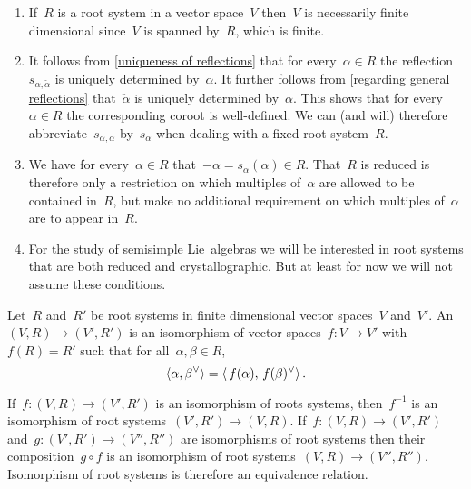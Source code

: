 \begin{remark}
  \leavevmode
  \begin{enumerate}
    \item
      If~$R$ is a root system in a vector space~$V$ then~$V$ is necessarily finite dimensional since~$V$ is spanned by~$R$, which is finite.
    \item
      It follows from \cref{uniqueness of reflections} that for every~$\alpha \in R$ the reflection~$s_{\alpha, \check{\alpha}}$ is uniquely determined by~$\alpha$.
      It further follows from \cref{regarding general reflections} that~$\check{\alpha}$ is uniquely determined by~$\alpha$.
      This shows that for every~$\alpha \in R$ the corresponding coroot is well-defined.
      We can (and will) therefore abbreviate~$s_{\alpha, \check{\alpha}}$ by~$s_\alpha$ when dealing with a fixed root system~$R$.
    \item
      We have for every~$\alpha \in R$ that~$-\alpha = s_\alpha(\alpha) \in R$.
      That~$R$ is reduced is therefore only a restriction on which multiples of~$\alpha$ are allowed to be contained in~$R$, but make no additional requirement on which multiples of~$\alpha$ are to appear in~$R$.
    \item
      For the study of semisimple Lie~algebras we will be interested in root systems that are both reduced and crystallographic.
      But at least for now we will not assume these conditions.
  \end{enumerate}
\end{remark}


\begin{definition}
  Let~$R$ and~$R'$ be root systems in finite dimensional vector spaces~$V$ and~$V'$.
  An ~$(V,R) \to (V',R')$ is an isomorphism of vector spaces~$f \colon V \to V'$ with~$f(R) = R'$ such that for all~$\alpha, \beta \in R$,
  \[
    \pair{\alpha, \check{\beta}}
    =
    \pair{\spacing f(\alpha), \spacing \check{f(\beta)}} \,.
  \]
\end{definition}


\begin{remark}
  If~$f \colon (V,R) \to (V',R')$ is an isomorphism of roots systems, then~$f^{-1}$ is an isomorphism of root systems~$(V',R') \to (V,R)$.
  If~$f \colon (V, R) \to (V', R')$ and~$g \colon (V', R') \to (V'', R'')$ are isomorphisms of root systems then their composition~$g \circ f$ is an isomorphism of root systems~$(V, R) \to (V'', R'')$.
  Isomorphism of root systems is therefore an equivalence relation.
\end{remark}


